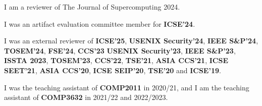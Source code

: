  






I am a reviewer of The Journal of Supercomputing 2024.

I was an artifact evaluation committee member for \textbf{ICSE'24}.

I was an external reviewer of \textbf{ICSE'25}, \textbf{USENIX Security'24}, \textbf{IEEE S\&P'24}, \textbf{TOSEM'24}, \textbf{FSE'24}, \textbf{CCS'23} \textbf{USENIX Security'23}, \textbf{IEEE S\&P'23}, \textbf{ISSTA 2023}, \textbf{TOSEM'23}, \textbf{CCS'22}, \textbf{TSE'21}, \textbf{ASIA CCS'21}, \textbf{ICSE SEET'21}, \textbf{ASIA CCS'20}, \textbf{ICSE SEIP'20}, \textbf{TSE'20} and \textbf{ICSE'19}.

I was the teaching assistant of \textbf{COMP2011} in 2020/21, and I am the teaching assistant of \textbf{COMP3632} in 2021/22 and 2022/2023.

